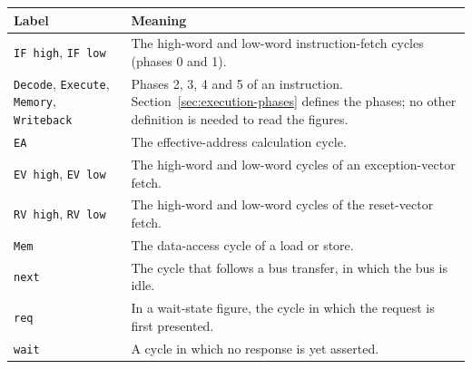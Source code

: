 \begin{table}[H]
	\centering
	\begin{tabularx}{\textwidth}{@{}p{4.2cm}X@{}}
		\toprule
		\textbf{Label}                                                         & \textbf{Meaning}                                                                                                                                  \\
		\midrule
		\texttt{IF high}, \texttt{IF low}                                      & The high-word and low-word instruction-fetch cycles (phases 0 and 1).                                                                             \\
		\texttt{Decode}, \texttt{Execute}, \texttt{Memory}, \texttt{Writeback} & Phases 2, 3, 4 and 5 of an instruction. Section~\ref{sec:execution-phases} defines the phases; no other definition is needed to read the figures. \\
		\texttt{EA}                                                            & The effective-address calculation cycle.                                                                                                          \\
		\texttt{EV high}, \texttt{EV low}                                      & The high-word and low-word cycles of an exception-vector fetch.                                                                                   \\
		\texttt{RV high}, \texttt{RV low}                                      & The high-word and low-word cycles of the reset-vector fetch.                                                                                      \\
		\texttt{Mem}                                                           & The data-access cycle of a load or store.                                                                                                         \\
		\texttt{next}                                                          & The cycle that follows a bus transfer, in which the bus is idle.                                                                                  \\
		\texttt{req}                                                           & In a wait-state figure, the cycle in which the request is first presented.                                                                        \\
		\texttt{wait}                                                          & A cycle in which no response is yet asserted.                                                                                                     \\

\end{tabularx}
\end{table}
